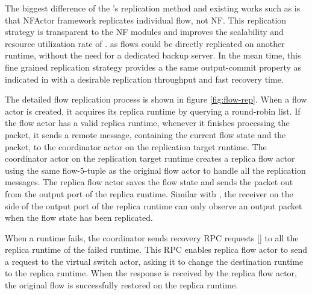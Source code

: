 The biggest difference of the \nfactor's replication method and existing works such as \cite{sherry2015rollback} is that NFActor framework replicates individual flow, not NF. This replication strategy is transparent to the NF modules and improves the scalability and resource utilization rate of \nfactor. as flows could be directly replicated on another runtime, without the need for a dedicated backup server. In the mean time, this fine grained replication strategy provides a the same output-commit property as indicated in \cite{sherry2015rollback} with a desirable replication throughput and fast recovery time.

The detailed flow replication process is shown in figure \ref{fig:flow-rep}. When a flow actor is created, it acquires its replica runtime by querying a round-robin list. If the flow actor has a valid replica runtime, whenever it finishes processing the packet, it sends a remote message, containing the current flow state and the packet, to the coordinator actor on the replication target runtime. The coordinator actor on the replication target runtime creates a replica flow actor using the same flow-5-tuple as the original flow actor to handle all the replication messages. The replica flow actor saves the flow state and sends the packet out from the output port of the replica runtime. Similar with \cite{sherry2015rollback}, the receiver on the side of the output port of the replica runtime can only observe an output packet when the flow state has been replicated.

When a runtime fails, the coordinator sends recovery RPC requests \ref{} to all the replica runtime of the failed runtime. This RPC enables replica flow actor to send a request to the virtual switch actor, asking it to change the destination runtime to the replica runtime. When the response is received by the replica flow actor, the original flow is successfully restored on the replica runtime.

